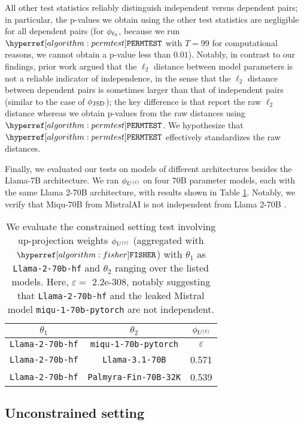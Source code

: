 All other test statistics reliably distinguish independent versus dependent pairs; in particular, the p-values we obtain using the other test statistics are negligible for all dependent pairs (for $\phi_{\ell_2}$, because we run $\permtest$ with $T = 99$ for computational reasons, we cannot obtain a p-value less than $0.01$).
Notably, in contrast to our findings, prior work \citep{xu2024instructionalfingerprintinglargelanguage} argued that the $\ell_2$ distance between model parameters is not a reliable indicator of independence, in the sense that the $\ell_2$ distance between dependent pairs is sometimes larger than that of independent pairs (similar to the case of $\phi_{\textup{JSD}}$); the key difference is that \citet{xu2024instructionalfingerprintinglargelanguage} report the raw $\ell_2$ distance whereas we obtain p-values from the raw distances using $\permtest$.
We hypothesize that $\permtest$ effectively standardizes the raw distances.

Finally, we evaluated our tests on models of different architectures besides the Llama-7B architecture. We ran $\phi_{U^{(\ell)}}$ on four 70B parameter models, each with the same Llama 2-70B architecture, with results shown in Table \ref{tab:70b}. Notably, we verify that Miqu-70B from MistralAI is not independent from Llama 2-70B \citep{2024miquscandal}. 

\begin{table}[]
    \centering
    \begin{tabular}{c|c|c}
    \hline 
        $\theta_1$ & $\theta_2$ & $\phi_{U^{(\ell)}}$ \\ \hline
        \texttt{Llama-2-70b-hf} & \texttt{miqu-1-70b-pytorch} & $\varepsilon$ \\ 
        \texttt{Llama-2-70b-hf} & \texttt{Llama-3.1-70B} & 0.571 \\ 
        \texttt{Llama-2-70b-hf} & \texttt{Palmyra-Fin-70B-32K} & 0.539 \\ \hline 
    \end{tabular}
    \caption{We evaluate the constrained setting test involving up-projection weights $\phi_{U^{(\ell)}}$ (aggregated with $\fisher$) with $\theta_1$ as \texttt{Llama-2-70b-hf} and $\theta_2$ ranging over the listed models. Here, $\varepsilon = $ 2.2e-308, notably suggesting that \texttt{Llama-2-70b-hf} and the leaked Mistral model \texttt{miqu-1-70b-pytorch} are not independent.}
    \label{tab:70b}
\end{table}

\subsection{Unconstrained setting}
\label{sec:adversarial-experiments}

